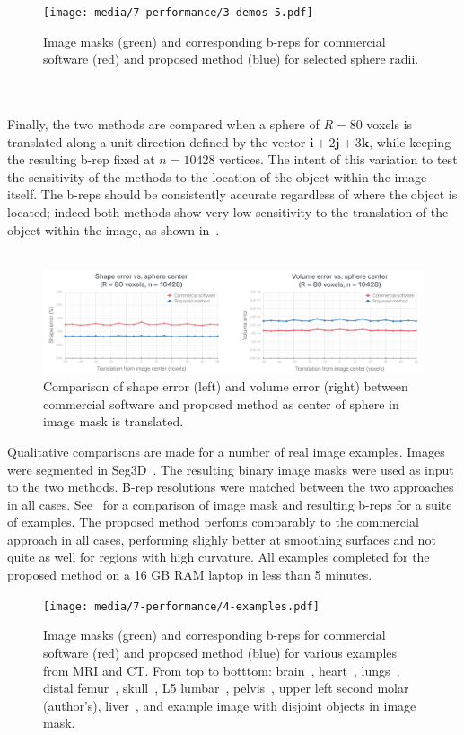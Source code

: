 \begin{figure}[ht!]
	\centering
	\texttt{[image: media/7-performance/3-demos-5.pdf]}
	\caption{Image masks (green) and corresponding b-reps for commercial software (red) and proposed method (blue) for selected sphere radii.}
	\label{fig:demos2}
\end{figure} \\ \\ 
%
Finally, the two methods are compared when a sphere of $R = 80$ voxels is translated along a unit direction defined by the vector $\bm{i}  + 2\bm{j} + 3\bm{k}$, while keeping the resulting b-rep fixed at $n = 10428$ vertices. The intent of this variation to test the sensitivity of the methods to the location of the object within the image itself. The b-reps should be consistently accurate regardless of where the object is located; indeed both methods show very low sensitivity to the translation of the object within the image, as shown in~. \\ \\
\begin{figure}[ht!]
	\centering
	\includegraphics[scale=0.25]{media/7-performance/2-graph-3.pdf}
	\caption{Comparison of shape error (left) and volume error (right) between commercial software and proposed method as center of sphere in image mask is translated.}
	\label{fig:graph3}
\end{figure}
%
Qualitative comparisons are made for a number of real image examples. Images were segmented in Seg3D~\cite{Seg3D}. The resulting binary image masks were used as input to the two methods. B-rep resolutions were matched between the two approaches in all cases. See~ for a comparison of image mask and resulting b-reps for a suite of examples. The proposed method perfoms comparably to the commercial approach in all cases, performing slighly better at smoothing surfaces and not quite as well for regions with high curvature. All examples completed for the proposed method on a 16 GB RAM laptop in less than 5 minutes.
\begin{figure}[ht!]
	\centering
	\texttt{[image: media/7-performance/4-examples.pdf]}
	\caption{Image masks (green) and corresponding b-reps for commercial software (red) and proposed method (blue) for various examples from MRI and CT. From top to botttom: brain~\cite{marcus_2007}, heart~\cite{winslow_2012}, lungs~\cite{rikxoort_2009}, distal femur~\cite{epperson_2013}, skull~\cite{clark_2013}, L5 lumbar~\cite{yao_2016}, pelvis~\cite{clark_2013}, upper left second molar (author's), liver~\cite{bilic_2019}, and example image with disjoint objects in image mask.}
	\label{fig:example-meshes}
\end{figure}